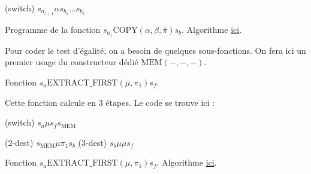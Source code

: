 \documentclass{report}
\begin{document}
\begin{appendices}
\begin{algorithm}[H]
					
					(switch) 	$s_{a_{r+1}} \alpha s_{b_1} \dots s_{b_k}$\;
					
					
					
					\caption{Programme de la fonction $s_{a_1}\text{COPY}(\alpha, \beta, \bar{\pi}) s_b$. Algorithme \hyperref[algo:A_RAM_fn_COPY]{ici}.}
				\end{algorithm}
				
				\espace
				
				Pour coder le test d'égalité, on a besoin de quelques sous-fonctions. On fera ici un premier usage du constructeur dédié $\text{MEM}\left( -, -, -\right)$.
				
				\espace
				
				\begin{algorithm}[H]
					\label{algo:A_RAM_fn_extract_first}
					
					
					\caption{Fonction $s_a \text{EXTRACT\_FIRST}(\mu, \pi_1) s_f$. }
				\end{algorithm}
				
				\espace
				
				Cette fonction calcule en $3$ étapes. Le code se trouve ici :
				
				\espace
				
				\begin{algorithm}[H]
					\label{prog:A_RAM_fn_extract_first}
					
					(switch)	$s_a \mu s_f s_{\text{MEM}}$\;
					
					(2-dest) 	$s_{\text{MEM}} \mu \pi_1 s_b$\;
					(3-dest) 	$s_b \mu \mu s_f$\;
					
					
					\caption{Fonction $s_a \text{EXTRACT\_FIRST}(\mu, \pi_1) s_f$. Algorithme \hyperref[algo:A_RAM_fn_extract_first]{ici}. }
				\end{algorithm}
				

\end{appendices}
\end{document}
